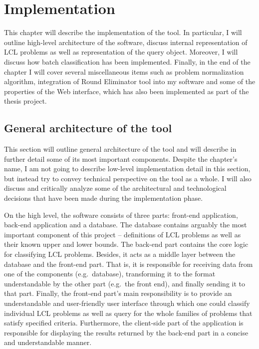 \chapter{Implementation}
\label{chapter:implementation}

This chapter will describe the implementation of the tool.
In particular, I will outline high-level architecture of
the software, discuss internal representation of
LCL problems as well as representation of the query object.
Moreover, I will discuss how batch classification has been
implemented. Finally, in the end of the chapter I will cover
several miscellaneous items such as problem normalization
algorithm, integration of Round Eliminator tool into
my software and some of the properties of the Web interface,
which has also been implemented as part of the thesis project.

\section{General architecture of the tool}

This section will outline general architecture of the tool and
will describe in further detail some of its most important
components. Despite the chapter's name, I am not going
to describe low-level implementation detail in this section,
but instead try to convey technical perspective on the tool
as a whole. I will also discuss and critically analyze some
of the architectural and technological decisions that have been
made during the implementation phase.

On the high level, the software consists of three parts:
front-end application, back-end application and a database.
The database contains arguably the most important component
of this project -- definitions of LCL problems as well as their
known upper and lower bounds. The back-end part contains
the core logic for classifying LCL problems. Besides, it acts
as a middle layer between the database and the front-end part.
That is, it is responsible for receiving data from one of the
components (e.g.\ database), transforming it to the
format understandable by the other part (e.g.\ the front end),
and finally sending it to that part. Finally, the
front-end part's main responsibility is to provide
an understandable and user-friendly user interface
through which one could classify individual LCL problems
as well as query for the whole families of problems
that satisfy specified criteria. Furthermore,
the client-side part of the application is
responsible for displaying the results returned by the
back-end part in a concise and understandable manner.

